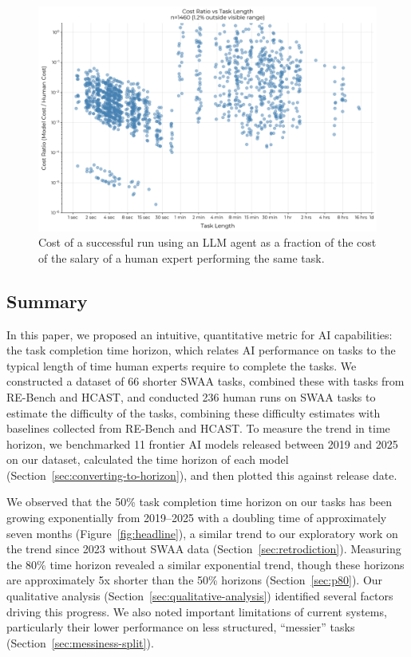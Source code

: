 \documentclass{article}
\newcommand{\gabenchmark}{HCAST}
\newcommand{\numswaatasks}{66}
\newcommand{\numswaabaselines}{236}
\begin{document}
\begin{figure}
    \centering
    \includegraphics[width=0.9\linewidth]{plots/cost/ratio_vs_length.png}
    \caption{Cost of a successful run using an LLM agent as a fraction of the cost of the salary of a human expert performing the same task.}
    \label{fig:cost-ratio}
\end{figure}

\subsection{Summary}

In this paper, we proposed an intuitive, quantitative metric for AI capabilities: the task completion time horizon, which relates AI performance on tasks to the typical length of time human experts require to complete the tasks. We constructed a dataset of \numswaatasks{} shorter SWAA tasks, combined these with tasks from RE-Bench and \gabenchmark{}, and conducted \numswaabaselines{} human runs on SWAA tasks to estimate the difficulty of the tasks, combining these difficulty estimates with baselines collected from RE-Bench and \gabenchmark{}. To measure the trend in time horizon, we benchmarked 11 frontier AI models released between 2019 and 2025 on our dataset, calculated the time horizon of each model (Section~\ref{sec:converting-to-horizon}), and then plotted this against release date.

We observed that the 50\% task completion time horizon on our tasks has been growing exponentially from 2019--2025 with a doubling time of approximately seven months (Figure~\ref{fig:headline}), a similar trend to our exploratory work on the trend since 2023 without SWAA data (Section~\ref{sec:retrodiction}). Measuring the 80\% time horizon revealed a similar exponential trend, though these horizons are approximately 5x shorter than the 50\% horizons (Section~\ref{sec:p80}). Our qualitative analysis (Section~\ref{sec:qualitative-analysis}) identified several factors driving this progress. We also noted important limitations of current systems, particularly their lower performance on less structured, ``messier'' tasks (Section~\ref{sec:messiness-split}).
\end{document}
